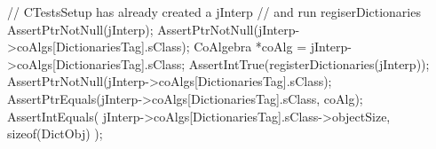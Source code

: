 
\startCTest
  // CTestsSetup has already created a jInterp
  // and run regiserDictionaries
  AssertPtrNotNull(jInterp);
  AssertPtrNotNull(jInterp->coAlgs[DictionariesTag].sClass);
  CoAlgebra *coAlg = jInterp->coAlgs[DictionariesTag].sClass;
  AssertIntTrue(registerDictionaries(jInterp));
  AssertPtrNotNull(jInterp->coAlgs[DictionariesTag].sClass);
  AssertPtrEquals(jInterp->coAlgs[DictionariesTag].sClass, coAlg);
  AssertIntEquals(
    jInterp->coAlgs[DictionariesTag].sClass->objectSize, 
    sizeof(DictObj)
  );
\stopCTest
\stopTestCase
\stopTestSuite

